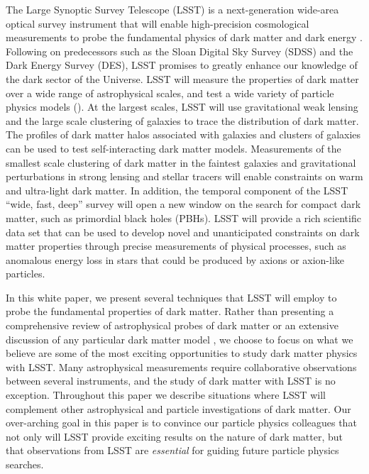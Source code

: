 The Large Synoptic Survey Telescope (LSST) is a next-generation wide-area optical survey instrument that will enable high-precision cosmological measurements to probe the fundamental physics of dark matter and dark energy \citep{0805.2366}. Following on predecessors such as the Sloan Digital Sky Survey (SDSS) and the Dark Energy Survey (DES), LSST promises to greatly enhance our knowledge of the dark sector of the Universe. 
LSST will measure the properties of dark matter over a wide range of astrophysical scales, and test a wide variety of particle physics models ().
At the largest scales, LSST will use gravitational weak lensing and the large scale clustering of galaxies to trace the distribution of dark matter.
The profiles of dark matter halos associated with galaxies and clusters of galaxies can be used to test self-interacting dark matter models.
Measurements of the smallest scale clustering of dark matter in the faintest galaxies and gravitational perturbations in strong lensing and stellar tracers will enable constraints on warm and ultra-light dark matter.
In addition, the temporal component of the LSST ``wide, fast, deep'' survey will open a new window on the search for compact dark matter, such as primordial black holes (PBHs).
LSST will provide a rich scientific data set that can be used to develop novel and unanticipated constraints on dark matter properties through precise measurements of physical processes, such as anomalous energy loss in stars that could be produced by axions or axion-like particles.

In this white paper, we present several techniques that LSST will employ to probe the fundamental properties of dark matter. 
Rather than presenting a comprehensive review of astrophysical probes of dark matter  \citep[e.g.,][]{BuckleyPeter:2017} or an extensive discussion of any particular dark matter model \citep[e.g.,][]{Jain:2019}, we choose to focus on what we believe are some of the most exciting opportunities to study dark matter physics with LSST. 
Many astrophysical measurements require collaborative observations between several instruments, and the study of dark matter with LSST is no exception. 
Throughout this paper we describe situations where LSST will complement other astrophysical and particle investigations of dark matter.
Our over-arching goal in this paper is to convince our particle physics colleagues that not only will LSST provide exciting results on the nature of dark matter, but that observations from LSST are {\it essential} for guiding future particle physics searches.

